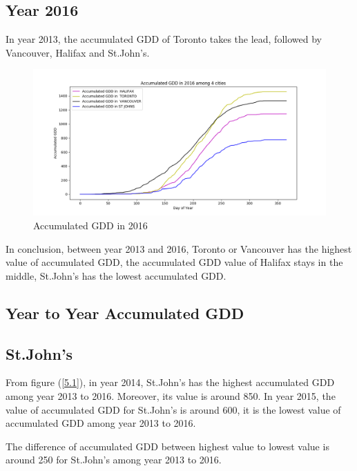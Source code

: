\documentclass[12pt]{article}
\begin{document}
\subsection{Year 2016}
In year 2013, the accumulated GDD of Toronto takes the lead, followed by Vancouver, Halifax and St.John's.
\begin{figure}[H]
\includegraphics[width=5.25in]{Plot/accGDD_2016.png}



\caption{Accumulated GDD in 2016}
\label{5.4}
\end{figure}

In conclusion, between year 2013 and 2016, Toronto or Vancouver has the highest value of accumulated GDD, the accumulated GDD value of Halifax stays in the middle, St.John's has the lowest accumulated GDD. 



\subsection{ \bf Year to Year Accumulated GDD }
\subsection{St.John's}

From figure (\ref{5.1}), in year 2014, St.John's has the highest accumulated GDD among year 2013 to 2016. Moreover, its value is around 850. In year 2015, the value of accumulated GDD for St.John's is around 600, it is the lowest value of accumulated GDD among year 2013 to 2016. 

The difference of accumulated GDD between highest value to lowest value is around 250 for St.John's among year 2013 to 2016.
\end{document}
